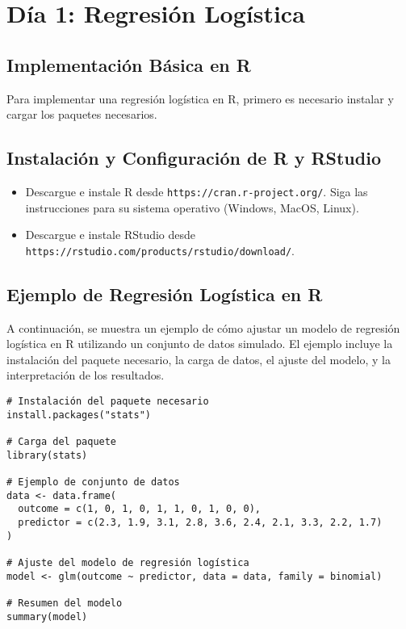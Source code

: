 \section{D\'ia 1: Regresión Logística}

\subsection*{Implementación Básica en R}

Para implementar una regresión logística en R, primero es necesario instalar y cargar los paquetes necesarios.

\subsection*{Instalación y Configuración de R y RStudio}
\begin{itemize}
    \item Descargue e instale R desde \texttt{https://cran.r-project.org/}. Siga las instrucciones para su sistema operativo (Windows, MacOS, Linux).
    \item Descargue e instale RStudio desde \texttt{https://rstudio.com/products/rstudio/download/}. 
\end{itemize}

\subsection{Ejemplo de Regresión Logística en R}

A continuación, se muestra un ejemplo de cómo ajustar un modelo de regresión logística en R utilizando un conjunto de datos simulado. El ejemplo incluye la instalación del paquete necesario, la carga de datos, el ajuste del modelo, y la interpretación de los resultados.

\begin{verbatim}
# Instalación del paquete necesario
install.packages("stats")

# Carga del paquete
library(stats)

# Ejemplo de conjunto de datos
data <- data.frame(
  outcome = c(1, 0, 1, 0, 1, 1, 0, 1, 0, 0),
  predictor = c(2.3, 1.9, 3.1, 2.8, 3.6, 2.4, 2.1, 3.3, 2.2, 1.7)
)

# Ajuste del modelo de regresión logística
model <- glm(outcome ~ predictor, data = data, family = binomial)

# Resumen del modelo
summary(model)
\end{verbatim}

